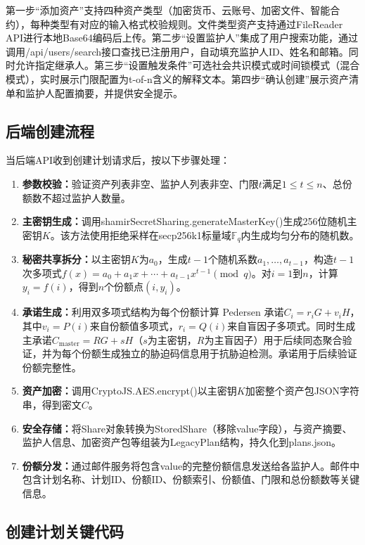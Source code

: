 \documentclass[UTF8,a4paper,zihao=-4,openany]{ctexrep}
\begin{document}
第一步“添加资产”支持四种资产类型（加密货币、云账号、加密文件、智能合约），每种类型有对应的输入格式校验规则。文件类型资产支持通过FileReader API进行本地Base64编码后上传。第二步“设置监护人”集成了用户搜索功能，通过调用/api/users/search接口查找已注册用户，自动填充监护人ID、姓名和邮箱。同时允许指定继承人。第三步“设置触发条件”可选社会共识模式或时间锁模式（混合模式），实时展示门限配置为t-of-n含义的解释文本。第四步“确认创建”展示资产清单和监护人配置摘要，并提供安全提示。

\subsection{后端创建流程}

当后端API收到创建计划请求后，按以下步骤处理：

\begin{enumerate}
  \item \textbf{参数校验：}验证资产列表非空、监护人列表非空、门限$t$满足$1 \le t \le n$、总份额数不超过监护人数量。
  \item \textbf{主密钥生成：}调用shamirSecretSharing.generateMasterKey()生成256位随机主密钥$K$。该方法使用拒绝采样在secp256k1标量域$\mathbb{F}_q$内生成均匀分布的随机数。
  \item \textbf{秘密共享拆分：}以主密钥$K$为$a_0$，生成$t-1$个随机系数$a_1,\dots,a_{t-1}$，构造$t-1$次多项式$f(x)=a_0+a_1x+\cdots+a_{t-1}x^{t-1} \pmod{q}$。对$i=1$到$n$，计算$y_i=f(i)$，得到$n$个份额点$(i, y_i)$。
  \item \textbf{承诺生成：}利用双多项式结构为每个份额计算 Pedersen 承诺$C_i = r_iG + v_iH$，其中$v_i = P(i)$来自份额值多项式，$r_i = Q(i)$来自盲因子多项式。同时生成主承诺$C_{\text{master}} = RG + sH$（$s$为主密钥，$R$为主盲因子）用于后续同态聚合验证，并为每个份额生成独立的胁迫码信息用于抗胁迫检测。承诺用于后续验证份额完整性。
  \item \textbf{资产加密：}调用CryptoJS.AES.encrypt()以主密钥$K$加密整个资产包JSON字符串，得到密文$C$。
  \item \textbf{安全存储：}将Share对象转换为StoredShare（移除value字段），与资产摘要、监护人信息、加密资产包等组装为LegacyPlan结构，持久化到plans.json。
  \item \textbf{份额分发：}通过邮件服务将包含value的完整份额信息发送给各监护人。邮件中包含计划名称、计划ID、份额ID、份额索引、份额值、门限和总份额数等关键信息。
\end{enumerate}

\subsection{创建计划关键代码}
\end{document}
